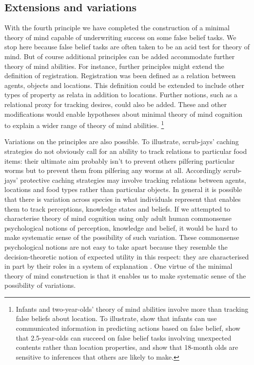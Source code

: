 \documentclass[12pt,\papersize]{extarticle}
\begin{document}
\subsection{Extensions and variations}
With the fourth principle we have completed the construction of a minimal theory of mind capable of underwriting success on some false belief tasks.  
We stop here because false belief tasks are often taken to be an acid test for theory of mind.
But of course additional principles can be added accommodate further theory of mind abilities.  
For instance, further principles might extend the definition of registration.  
Registration was been defined as a relation between agents, objects and locations. 
This definition could be extended to include  other types of property as relata in addition to locations.  
Further notions, such as a relational proxy for tracking desires, could also be added.  
These and other modifications would enable hypotheses about minimal theory of mind cognition  to explain a wider range of theory of mind abilities.%
\footnote{
Infants and two-year-olds' theory of mind abilities involve more than tracking false beliefs about location.
To illustrate, \citet{en_1691} show that infants can use communicated information in predicting actions based on false belief, 
\citet{he:2011_false}  show that 2.5-year-olds can succeed on false belief tasks involving unexpected contents rather than location properties, 
and  \citet{en_1795}  show that 18-month olds are sensitive to inferences that others are likely to make. 
}


Variations on the principles are also possible.  To illustrate, scrub-jays’ caching strategies do not obviously call for an ability to track relations to particular food items: their ultimate aim probably isn’t to prevent others pilfering particular worms but to prevent them from pilfering any worms at all.  Accordingly scrub-jays’ protective caching strategies may involve tracking relations between agents, locations and food types rather than particular objects.  
In general it is possible that there is variation across species in what individuals represent that enables them to track perceptions, knowledge states and beliefs. 
If we attempted to characterise theory of mind cognition using only adult human commonsense psychological notions of perception, knowledge and belief, it would be hard to make systematic  sense of the possibility of such variation.
These commonsense psychological notions are not easy to take apart because they resemble the decision-theoretic notion of expected utility in this respect: they are characterised in part by their roles in a system of explanation \citep{Davidson:1985qg,Davidson:1999ju}.
One virtue of the minimal theory of mind construction is that it enables us to make systematic sense of the possibility of variations. 
\end{document}
